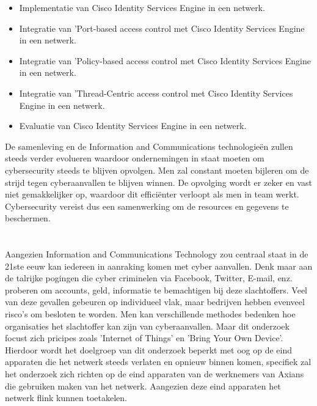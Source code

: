 \begin{itemize}
	\item Implementatie van Cisco Identity Services Engine in een netwerk.
	\item Integratie van 'Port-based access control met Cisco Identity Services Engine in een netwerk.
	\item Integratie van 'Policy-based access control met Cisco Identity Services Engine in een netwerk.
	\item Integratie van 'Thread-Centric access control met Cisco Identity Services Engine in een netwerk.
	\item Evaluatie van Cisco Identity Services Engine in een netwerk.
\end{itemize}

De samenleving en de Information and Communications technologieën zullen steeds verder evolueren waardoor ondernemingen in staat moeten om cybersecurity steeds te blijven opvolgen. Men zal constant moeten bijleren om de strijd tegen cyberaanvallen te blijven winnen. De opvolging wordt er zeker en vast niet gemakkelijker op, waardoor dit efficiënter verloopt als men in team werkt. Cybersecurity vereist dus een samenwerking om de resources en gegevens te beschermen.

\section{}
\label{sec:probleemstelling}
Aangezien Information and Communications Technology zou centraal staat in de 21ste eeuw kan iedereen in aanraking komen met cyber aanvallen. Denk maar aan de talrijke pogingen die cyber criminelen via Facebook, Twitter, E-mail, enz. proberen om accounts, geld, informatie te bemachtigen bij deze slachtoffers. Veel van deze gevallen gebeuren op individueel vlak, maar bedrijven hebben evenveel risco's om besloten te worden. Men kan verschillende methodes bedenken hoe organisaties het slachtoffer kan zijn van cyberaanvallen. Maar dit onderzoek focust zich pricipes zoals 'Internet of Things' en 'Bring Your Own Device'.
\newline
\newline
Hierdoor wordt het doelgroep van dit onderzoek beperkt met oog op de eind apparaten die het netwerk steeds verlaten en opnieuw binnen komen, specifiek zal het onderzoek zich richten op de eind apparaten van de werknemers van Axians die gebruiken maken van het netwerk. Aangezien deze eind apparaten het netwerk flink kunnen toetakelen.


